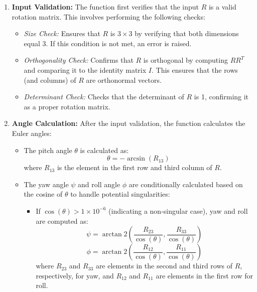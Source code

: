 \begin{enumerate}
    \item \textbf{Input Validation:}
    The function first verifies that the input \( R \) is a valid rotation matrix. This involves performing the following checks:
        \begin{itemize}
        \item \textit{Size Check:} Ensures that \( R \) is \( 3 \times 3 \) by verifying that both dimensions equal 3. If this condition is not met, an error is raised.
        
        \item \textit{Orthogonality Check:} Confirms that \( R \) is orthogonal by computing \( R R^T \) and comparing it to the identity matrix \( I \). This ensures that the rows (and columns) of \( R \) are orthonormal vectors.
        
        \item \textit{Determinant Check:} Checks that the determinant of \( R \) is 1, confirming it as a proper rotation matrix.
    \end{itemize}

    \item \textbf{Angle Calculation:}
    After the input validation, the function calculates the Euler angles:
    \begin{itemize}
        \item The pitch angle \(\theta\) is calculated as:
        \begin{equation}
        \theta = -\arcsin(R_{13})
        \end{equation}
        where \( R_{13} \) is the element in the first row and third column of \( R \).

        \item The yaw angle \(\psi\) and roll angle \(\phi\) are conditionally calculated based on the cosine of \(\theta\) to handle potential singularities:
        \begin{itemize}
            \item If \( \cos(\theta) > 1 \times 10^{-6} \) (indicating a non-singular case), yaw and roll are computed as:
            \begin{equation}
            \psi = \arctan2\left(\frac{R_{23}}{\cos(\theta)}, \frac{R_{33}}{\cos(\theta)}\right)
            \end{equation}
            \begin{equation}
            \phi = \arctan2\left(\frac{R_{12}}{\cos(\theta)}, \frac{R_{11}}{\cos(\theta)}\right)
            \end{equation}
            where \( R_{23} \) and \( R_{33} \) are elements in the second and third rows of \( R \), respectively, for yaw, and \( R_{12} \) and \( R_{11} \) are elements in the first row for roll.


\end{itemize}
\end{itemize}
\end{enumerate}
